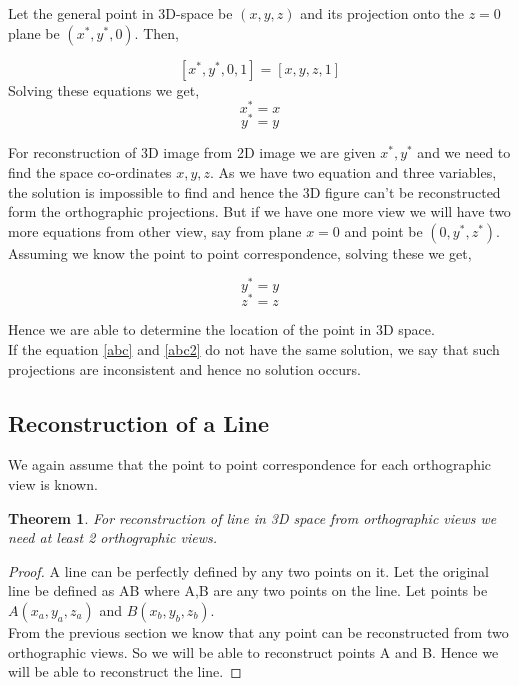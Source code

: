 \documentclass[12pt]{article}
\newtheorem{theorem}{Theorem}
\begin{document}
Let the general point in 3D-space be $(x,y,z)$ and its projection onto the $z=0$ plane be $(x^*,y^*,0)$. Then,

	\[
		[x^*,y^*,0,1] = [x,y,z,1]
	\]
Solving these equations we get,
	\begin{equation}
		x^* = x
	\end{equation}
	\begin{equation}
		y^* = y
	\end{equation}

For reconstruction of 3D image from 2D image we are given $x^*,y^*$ and we need to find the space co-ordinates $x,y,z$. As we have two equation and three variables, the solution is impossible to find and hence the 3D figure can't be reconstructed form the orthographic projections. But if we have one more view we will have two more equations from other view, say from plane $x=0$ and point be $(0,y^*,z^*)$. Assuming we know the point to point correspondence, solving these we get,
	
	\begin{equation}
	\label{abc}
		y^* = y
	\end{equation}
	\begin{equation}
	\label{abc2}
		z^* = z
	\end{equation}

Hence we are able to determine the location of the point in 3D space.\\
If the equation \eqref{abc} and \eqref{abc2} do not have the same solution, we say that such projections are inconsistent and hence no solution occurs.

\subsection{Reconstruction of a Line}
	
	We again assume that the point to point correspondence for each orthographic view is known.
	
	\begin{theorem}
		For reconstruction of line in 3D space from orthographic views we need at least 2 orthographic views.
	\end{theorem} 
	\begin{proof}
		A line can be perfectly defined by any two points on it. Let the original line be defined as AB where A,B are any two points on the line. Let points be $A(x_a,y_a,z_a)$ and $B(x_b,y_b,z_b)$.\\
		From the previous section we know that any point can be reconstructed from two orthographic views. So we will be able to reconstruct points A and B. Hence we will be able to reconstruct the line.  
	\end{proof}
\end{document}
